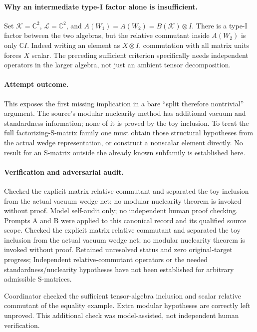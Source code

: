 \documentclass[11pt]{article}
\begin{document}
\paragraph{Why an intermediate type-I factor alone is insufficient.} Set $\mathcal K=\mathbb C^2$, $\mathcal L=\mathbb C^2$, and $A(W_1)=A(W_2)=B(\mathcal K)\otimes I$. There is a type-I factor between the two algebras, but the relative commutant inside $A(W_2)$ is only $\mathbb C I$. Indeed writing an element as $X\otimes I$, commutation with all matrix units forces $X$ scalar. The preceding sufficient criterion specifically needs independent operators in the larger algebra, not just an ambient tensor decomposition.

\paragraph{Attempt outcome.} This exposes the first missing implication in a bare ``split therefore nontrivial'' argument. The source's modular nuclearity method has additional vacuum and standardness information; none of it is proved by the toy inclusion. To treat the full factorizing-S-matrix family one must obtain those structural hypotheses from the actual wedge representation, or construct a nonscalar element directly. No result for an S-matrix outside the already known subfamily is established here.

\paragraph{Verification and adversarial audit.}
Checked the explicit matrix relative commutant and separated the toy inclusion from the actual vacuum wedge net; no modular nuclearity theorem is invoked without proof. Model self-audit only; no independent human proof checking. Prompts A and B were applied to this canonical record and its qualified source scope. Checked the explicit matrix relative commutant and separated the toy inclusion from the actual vacuum wedge net; no modular nuclearity theorem is invoked without proof. Retained unresolved status and zero original-target progress; Independent relative-commutant operators or the needed standardness/nuclearity hypotheses have not been established for arbitrary admissible S-matrices.

Coordinator checked the sufficient tensor-algebra inclusion and scalar relative commutant of the equality example. Extra modular hypotheses are correctly left unproved. This additional check was model-assisted, not independent human verification.
\end{document}

